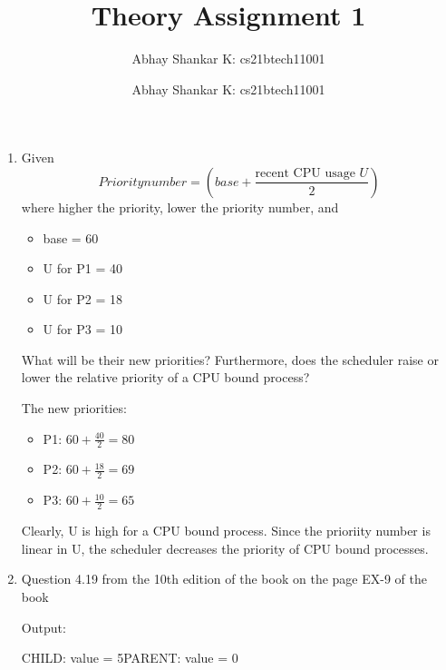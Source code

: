 \documentclass{amsart}
\author{Abhay Shankar K: cs21btech11001}
\newcommand{\me}{
    \author{Abhay Shankar K: cs21btech11001}
    \maketitle
}
\begin{document}
\title{Theory Assignment 1}
\me

\newcommand{\brak}[1]{\ensuremath{\left(#1\right)}} %
\newcommand{\abrak}[1]{\ensuremath{\left\langle#1\right\rangle}}
\newcommand{\sbrak}[1]{\ensuremath{\left[#1\right]}}
\newcommand{\cbrak}[1]{\ensuremath{\left\{#1\right\}}}
    \begin{enumerate}
        \item Given \[Prioritynumber = \brak{base + \frac{\text{recent CPU usage } U}{2}}\] where higher the priority, lower the priority number, and \begin{itemize}
            \item base = 60
            \item U for P1 = 40
            \item U for P2 = 18
            \item U for P3 = 10
        \end{itemize}
        What will be their new priorities? Furthermore, does the scheduler raise or lower the relative priority of a CPU bound process?

        The new priorities: \begin{itemize}
            \item P1: $60 + \frac{40}{2} = 80$ \\
            
            \item P2: $60 + \frac{18}{2} = 69$ \\
            
            \item P3: $60 + \frac{10}{2} = 65$ \\
        \end{itemize}

        Clearly, U is high for a CPU bound process. Since the prioriity number is linear in U, the scheduler decreases the priority of CPU bound processes.

        \item Question 4.19 from the 10th edition of the book on the page EX-9 of the book
            
        Output:

                CHILD: value = 5PARENT: value = 0


\end{enumerate}
\end{document}
